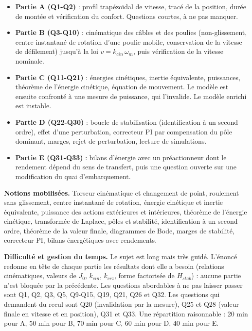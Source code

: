 \documentclass[11pt,a4paper]{article}
\providecommand{\tightlist}{\setlength{\itemsep}{0pt}\setlength{\parskip}{0pt}}
\begin{document}
\begin{itemize}
\tightlist
\item
  \textbf{Partie A (Q1-Q2)} : profil trapézoïdal de vitesse, tracé de la position, durée de montée et vérification du confort. Questions courtes, à ne pas manquer.
\item
  \textbf{Partie B (Q3-Q10)} : cinématique des câbles et des poulies (non-glissement, centre instantané de rotation d'une poulie mobile, conservation de la vitesse de défilement) jusqu'à la loi \(v=k_{cin}\,\omega_m\), puis vérification de la vitesse nominale.
\item
  \textbf{Partie C (Q11-Q21)} : énergies cinétiques, inertie équivalente, puissances, théorème de l'énergie cinétique, équation de mouvement. Le modèle est ensuite confronté à une mesure de puissance, qui l'invalide. Le modèle enrichi est instable.
\item
  \textbf{Partie D (Q22-Q30)} : boucle de stabilisation (identification à un second ordre), effet d'une perturbation, correcteur PI par compensation du pôle dominant, marges, rejet de perturbation, lecture de simulations.
\item
  \textbf{Partie E (Q31-Q33)} : bilans d'énergie avec un préactionneur dont le rendement dépend du sens de transfert, puis une question ouverte sur une modification du quai d'embarquement.
\end{itemize}

\textbf{Notions mobilisées.} Torseur cinématique et changement de point, roulement sans glissement, centre instantané de rotation, énergie cinétique et inertie équivalente, puissance des actions extérieures et intérieures, théorème de l'énergie cinétique, transformée de Laplace, pôles et stabilité, identification à un second ordre, théorème de la valeur finale, diagrammes de Bode, marges de stabilité, correcteur PI, bilans énergétiques avec rendements.

\textbf{Difficulté et gestion du temps.} Le sujet est long mais très guidé. L'énoncé redonne en tête de chaque partie les résultats dont elle a besoin (relations cinématiques, valeurs de \(J_0\), \(k_{cin}\), \(k_{crz}\), forme factorisée de \(H_{stab}\)) : aucune partie n'est bloquée par la précédente. Les questions abordables à ne pas laisser passer sont Q1, Q2, Q3, Q5, Q9-Q15, Q19, Q21, Q26 et Q32. Les questions qui demandent du recul sont Q20 (invalidation par la mesure), Q25 et Q28 (valeur finale en vitesse et en position), Q31 et Q33. Une répartition raisonnable : 20 min pour A, 50 min pour B, 70 min pour C, 60 min pour D, 40 min pour E.
\end{document}
